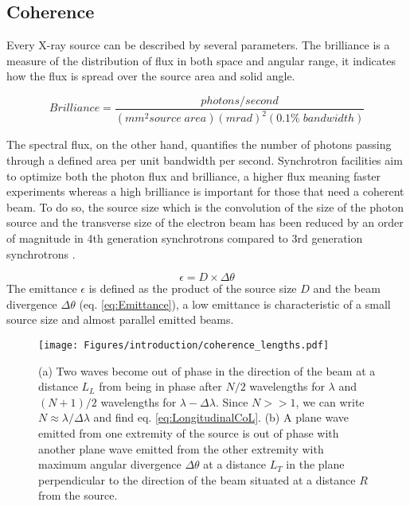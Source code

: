 \subsection{Coherence}

Every X-ray source can be described by several parameters.
The brilliance is a measure of the distribution of flux in both space and angular range, it indicates how the flux is spread over the source area and solid angle.

\begin{equation}
    Brilliance = \frac{photons/second}{(mm^2 source \; area)(mrad)^2(0.1\% \; bandwidth)}
\end{equation}

The spectral flux, on the other hand, quantifies the number of photons passing through a defined area per unit bandwidth per second.
Synchrotron facilities aim to optimize both the photon flux and brilliance, a higher flux meaning faster experiments whereas a high brilliance is important for those that need a coherent beam.
To do so, the source size which is the convolution of the size of the photon source and the transverse size of the electron beam has been reduced by an order of magnitude in 4th generation synchrotrons compared to 3rd generation synchrotrons \parencite{Willmott}.

\begin{equation}
    \label{eq:Emittance}
    \epsilon = D \times \Delta\theta
\end{equation}
The emittance $\epsilon$ is defined as the product of the source size $D$ and the beam divergence $\Delta\theta$ (eq. \ref{eq:Emittance}), a low emittance is characteristic of a small source size and almost parallel emitted beams.

\begin{figure}[!htb]
    \centering
    \texttt{[image: Figures/introduction/coherence\_lengths.pdf]}
    \caption{
    (a) Two waves become out of phase in the direction of the beam at a distance $L_L$ from being in phase after $N/2$ wavelengths for $\lambda$ and $(N+1)/2$ wavelengths for $\lambda - \Delta\lambda$. Since $N >> 1$, we can write $N\approx\lambda/\Delta\lambda$ and find eq. \ref{eq:LongitudinalCoL}.
    (b) A plane wave emitted from one extremity of the source is out of phase with another plane wave emitted from the other extremity with maximum angular divergence $\Delta\theta$ at a distance $L_T$ in the plane perpendicular to the direction of the beam situated at a distance $R$ from the source.
    }
    \label{fig:CoherenceLengths}
\end{figure}


